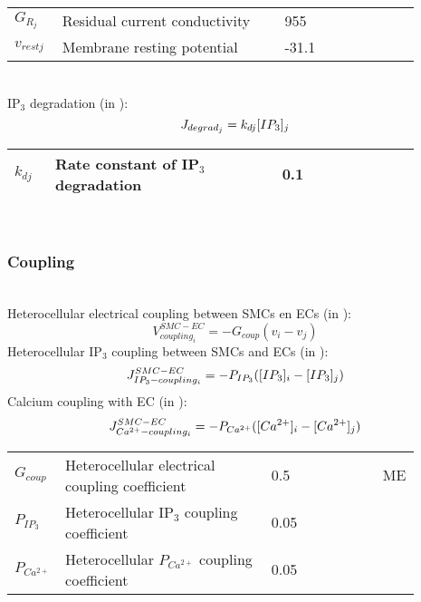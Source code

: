 %
\begin{table}[h!]
\centering
\begin{tabular}{ p{0.09\linewidth}  >{\footnotesize} p{0.5\linewidth}  >{\footnotesize} p{0.27\linewidth} >{\footnotesize} p{0.03\linewidth} }
\hline
$G_{R_{j}}$      		& Residual current conductivity										& 955 \pS			& \cite{Koenigsberger2006} \\
$v_{rest j}$      		& Membrane resting potential						 				& -31.1 \mV		& \cite{Koenigsberger2006} \\
\hline
\end{tabular}
\label{tab:JRj}
\end{table}
\\
%
IP$_{3}$ degradation (in \uMs):  
\begin{equation} \label{eq:Jdegradj}
J_{degrad_{j}}= k_{dj} [IP_{3}]_{j}
\end{equation}
%
\begin{table}[h!]
\centering
\begin{tabular}{ p{0.09\linewidth}  >{\footnotesize} p{0.5\linewidth}  >{\footnotesize} p{0.27\linewidth} >{\footnotesize} p{0.03\linewidth} }
\hline
$k_{dj}$      			& Rate constant of IP$_{3}$ degradation						 		& 0.1 \pers		& \cite{Koenigsberger2006} \\
\hline
\end{tabular}
\label{tab:Jdegradj}
\end{table}
\\
%
%
\subsubsection*{Coupling}~\\
%
Heterocellular electrical coupling between SMCs en ECs (in \mVs):
\begin{equation} \label{eq:Vcouplingi}
V_{coupling_{i}}^{SMC-EC}= -G_{coup}(v_{i}-v_{j})
\end{equation}
%
Heterocellular IP$_{3}$ coupling between SMCs and ECs (in \uMs):
\begin{equation} \label{eq:JIP3couplingi}
J_{IP_{3}-coupling_{i}}^{SMC-EC}= -P_{IP_{3}}([IP_{3}]_{i}-[IP_{3}]_{j})
\end{equation}
%
Calcium coupling with EC (in \uMs):
\begin{equation} \label{eq:JCAcouplingi}
J_{Ca^{2+}-coupling_{i}}^{SMC-EC}= -P_{Ca^{2+}}([Ca^{2+}]_{i}-[Ca^{2+}]_{j})
\end{equation}
%
\begin{table}[h!]
\centering
\begin{tabular}{ p{0.09\linewidth}  >{\footnotesize} p{0.5\linewidth}  >{\footnotesize} p{0.27\linewidth} >{\footnotesize} p{0.03\linewidth} }
\hline
$G_{coup}$      		& Heterocellular electrical coupling coefficient		& 0.5 \pers	& ME \\
$P_{IP_{3}}$      		& Heterocellular IP$_{3}$ coupling coefficient	& 0.05 \pers	&  \cite{Koenigsberger2006} \\
$P_{Ca^{2+}}$      		& Heterocellular $P_{Ca^{2+}}$ coupling coefficient	& 0.05 \pers	&  \cite{Koenigsberger2006} \\
\hline
\end{tabular}
\label{tab:JCA3couplingi}
\end{table}
%
